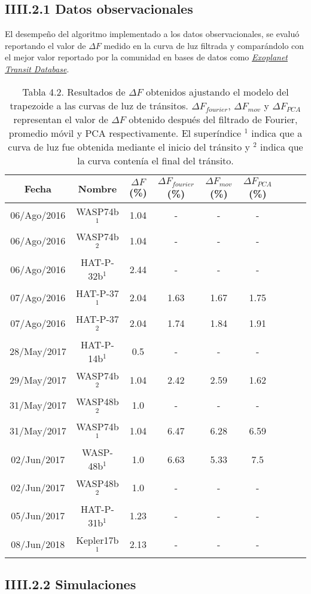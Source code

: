 \subsection*{IIII.2.1 Datos observacionales}

 El desempeño del algoritmo implementado a los datos observacionales, se evaluó reportando el valor de $\Delta F$ medido en la curva de luz filtrada y comparándolo con el mejor valor reportado por la comunidad en bases de datos como \href{http://var2.astro.cz/ETD/index.php}{\textit{Exoplanet Transit Database}}. 


\begin{table}
	\hspace{-1.7cm}
	\begin{footnotesize}
	\begin{tabular}{ccccccccc}
	\hline 
	Fecha & Nombre & $\Delta F$ (\%) & $\Delta F_{fourier}$ (\%) &  $\Delta F_{mov}$ (\%) & $\Delta F_{PCA}$ (\%) \\ 
	\hline
	06/Ago/2016 & WASP74b$^{1}$ & 1.04 & - & - & - \\ 
	06/Ago/2016 & WASP74b$^{2}$ & 1.04 & - & - & - \\
	06/Ago/2016 & HAT-P-32b$^{1}$ & 2.44 & - & - & - \\
	07/Ago/2016 & HAT-P-37$^{1}$ & 2.04 & 1.63 & 1.67 & 1.75 \\ 
	07/Ago/2016 & HAT-P-37$^{2}$ & 2.04 & 1.74 & 1.84 & 1.91 \\ 
	28/May/2017 & HAT-P-14b$^{1}$ & 0.5 & - & - & - \\ 
	29/May/2017 & WASP74b$^{2}$ & 1.04 & 2.42 & 2.59 & 1.62 \\ 
	31/May/2017 & WASP48b$^{2}$ & 1.0 & - & - & - \\  
	31/May/2017 & WASP74b$^{1}$ & 1.04 & 6.47 & 6.28 & 6.59 \\
	02/Jun/2017 & WASP-48b$^{1}$ & 1.0 & 6.63 & 5.33 & 7.5 \\
	02/Jun/2017 & WASP48b$^{2}$ & 1.0 & - & - & - \\
	05/Jun/2017 & HAT-P-31b$^{1}$ & 1.23 & - & - & - \\
	08/Jun/2018 & Kepler17b$^{1}$ & 2.13 & - & - & - \\ 
	\hline 
	\end{tabular} 
	\end{footnotesize}
	\caption{Tabla 4.2. Resultados de $\Delta F$ obtenidos ajustando el modelo del trapezoide a las curvas de luz de tránsitos. $\Delta F_{fourier}$, $\Delta F_{mov}$ y $\Delta F_{PCA}$ representan el valor de $\Delta F$ obtenido después del filtrado de Fourier, promedio móvil y PCA respectivamente. El superíndice $^{1}$ indica que a curva de luz fue obtenida mediante el inicio del tránsito y $^{2}$ indica que la curva contenía el final del tránsito.}
	\end{table}


\subsection*{IIII.2.2 Simulaciones}


